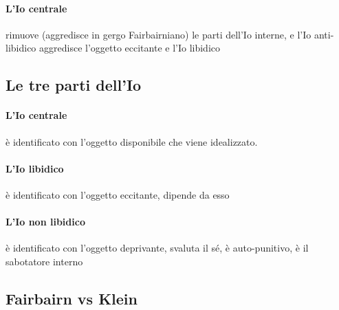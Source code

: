 \documentclass[12pt, a4paper]{article}
\begin{document}
\paragraph{L'Io centrale} rimuove (aggredisce in gergo Fairbairniano) le parti dell'Io interne, e l'Io anti-libidico aggredisce l'oggetto eccitante e l'Io libidico

\subsection{Le tre parti dell'Io}

\paragraph{L'Io centrale} \`e identificato con l'oggetto disponibile che viene idealizzato.

\paragraph{L'Io libidico} \`e identificato con l'oggetto eccitante, dipende da esso 

\paragraph{L'Io non libidico} \`e identificato con l'oggetto deprivante, svaluta il s\'e, \`e auto-punitivo, \`e il sabotatore interno

\subsection{Fairbairn vs Klein}
\end{document}
